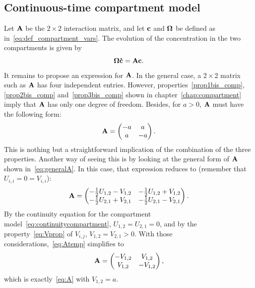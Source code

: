 \subsection{Continuous-time compartment model} \label{sec:ctcm}
Let $\mathbf A$ be the $2 \times 2$ interaction matrix, and let $\mathbf c$ and $\boldsymbol \Omega$ be defined as in~\eqref{eq:def_compartment_vars}. The evolution of the concentration in the two compartments is given by
\begin{equation} \label{eq:generalEDOp2b}
 	\boldsymbol \Omega \mathbf{\dot{c}} = \mathbf A \mathbf c.
\end{equation}
It remains to propose an expression for $\mathbf A$. In the general case, a $2 \times 2$ matrix such as $\mathbf A$ has four independent entries. However, properties~\ref{prop1bis_comp}, \ref{prop2bis_comp} and~\ref{prop3bis_comp} shown in chapter~\ref{chap:compartment} imply that $\mathbf A$ has only one degree of freedom. Besides, for $a > 0$, $\mathbf A$ must have the following form:
\begin{equation} \label{eq:A}
	\mathbf A = \begin{pmatrix}
		-a & a\\
		a & -a
	\end{pmatrix}.
\end{equation}
This is nothing but a straightforward implication of the combination of the three properties. Another way of seeing this is by looking at the general form of $\mathbf A$ shown in~\eqref{eq:generalA}. In this case, that expression reduces to (remember that $U_{i,i} = 0 = V_{i,i}$):
\begin{equation} \label{eq:Atemp}
	\mathbf A = \begin{pmatrix}
		-\frac{1}{2} U_{1,2} - V_{1,2} & -\frac{1}{2}U_{1,2} + V_{1,2}\\
		-\frac{1}{2}U_{2,1} + V_{2,1} & -\frac{1}{2}U_{2,1} - V_{2,1}
	\end{pmatrix}.
\end{equation}
By the continuity equation for the compartment model~\eqref{eq:continuitycompartment}, $U_{1,2} = U_{2,1} = 0$, and by the property~\eqref{eq:Vprop} of $V_{i,j}$, $V_{1,2} = V_{2,1} > 0$. With those considerations,~\eqref{eq:Atemp} simplifies to
\begin{equation}
	\mathbf A = \begin{pmatrix}
		- V_{1,2} & V_{1,2}\\
		V_{1,2} & -V_{1,2}
	\end{pmatrix},
\end{equation}
which is exactly~\eqref{eq:A} with $V_{1,2} = a$.

